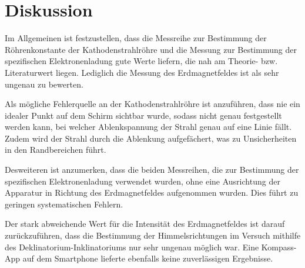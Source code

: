 \section{Diskussion}
\label{sec:Diskussion}

Im Allgemeinen ist festzustellen, dass die Messreihe zur Bestimmung der Röhrenkonstante
der Kathodenstrahlröhre und die Messung zur Bestimmung der spezifischen Elektronenladung
gute Werte liefern, die nah am Theorie- bzw. Literaturwert liegen. Lediglich die
Messung des Erdmagnetfeldes ist als sehr ungenau zu bewerten.

Als mögliche Fehlerquelle an der Kathodenstrahlröhre ist anzuführen, dass nie
ein idealer Punkt auf dem Schirm sichtbar wurde, sodass nicht genau festgestellt
werden kann, bei welcher Ablenkspannung der Strahl genau auf eine Linie fällt.
Zudem wird der Strahl durch die Ablenkung aufgefächert, was zu Unsicherheiten
in den Randbereichen führt.

Desweiteren ist anzumerken, dass die beiden Messreihen, die zur Bestimmung der
spezifischen Elektronenladung verwendet wurden, ohne eine Ausrichtung der Apparatur
in Richtung des Erdmagnetfeldes aufgenommen wurden. Dies führt zu geringen
systematischen Fehlern.

Der stark abweichende Wert für die Intensität des Erdmagnetfeldes ist darauf zurückzuführen,
dass die Bestimmung der Himmelsrichtungen im Versuch mithilfe des Deklinatorium-Inklinatoriums
nur sehr ungenau möglich war. Eine Kompass-App auf dem Smartphone lieferte ebenfalls
keine zuverlässigen Ergebnisse.
